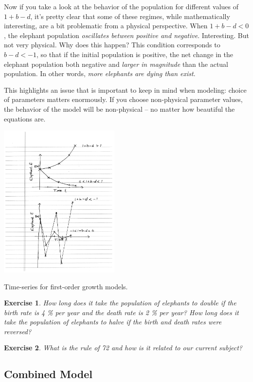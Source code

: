 \documentclass{tufte-handout}
\newtheorem{del}{Exercise}
\begin{document}
Now if you take a look at the behavior of the population for different values of $1+b-d$, it's pretty clear that some of these regimes, while mathematically interesting, are a bit problematic from a physical perspective.   When $1+b-d<0$, the elephant population {\it oscillates between positive and negative}.  Interesting.  But not very physical.  Why does this happen?  This condition corresponds to $b-d<-1$, so that if the initial population is positive, the net change in the elephant population both negative and {\it larger in magnitude} than the actual population.  In other words, {\it more elephants are dying than exist}.  

This highlights an issue that is important to keep in mind when modeling:  choice of parameters matters enormously.  If you choose non-physical parameter values, the behavior of the model will be non-physical -- no matter how beautiful the equations are.

\begin{marginfigure}
\includegraphics[width=6cm]{figs/first_order}
\caption{Time-series for first-order growth models. }
\end{marginfigure}


\begin{del}
How long does it take the population of elephants to double if the birth rate is 4 \% per year and the death rate is 2 \% per year? How long does it take the population of elephants to halve if the birth and death rates were reversed?
\end{del}

\begin{del}
What is the {\it rule of 72} and how is it related to our current subject?
\end{del}

\subsection{Combined Model}
\end{document}
